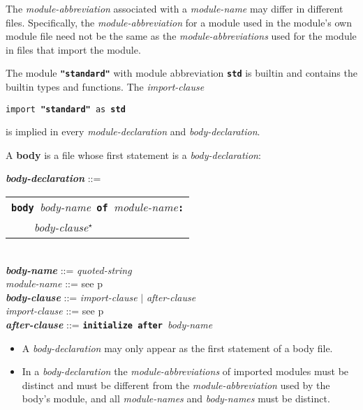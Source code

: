 \documentclass[12pt]{article}
\newcommand{\TT}[1]{{\tt \bfseries #1}}
\newcommand{\STAR}{{\Large $^\star$}}
\newcommand{\key}[1]{{\rm \bfseries #1}}
\newcommand{\ttkey}[1]{{\tt \bfseries #1}}
\newcommand{\emkey}[1]{{\em \bfseries #1}}
\newcommand{\pagref}[1]{p\pageref{#1}}
\newenvironment{indpar}[1][0.3in]%
	{\begin{list}{}%
		     {\setlength{\itemsep}{0in}%
		      \setlength{\topsep}{0in}%
		      \setlength{\parsep}{1ex}%
		      \setlength{\labelwidth}{#1}%
		      \setlength{\leftmargin}{#1}%
		      \addtolength{\leftmargin}{\labelsep}}%
	 \item}%
	{\end{list}}
\begin{document}
The {\em module-abbreviation} associated with a {\em module-name}
may differ in different files.  Specifically, the {\em module-abbreviation}
for a module used in the module's own module file need not be the same
as the {\em module-abbreviations} used for the module in files
that import the module.

The module \TT{"standard"}\index{standard@\TT{"standard"}} with
module abbreviation \ttkey{std} is builtin and contains the builtin types and
functions.  The {\em import-clause}
\begin{center}
{\tt import }\TT{"standard"}{\tt{} as \ttkey{std}}
\end{center}
is implied in every {\em module-declaration} and
{\em body-declaration}.

A \key{body} is a file whose first statement is a {\em body-declaration}:

\begin{indpar}
\emkey{body-declaration}\label{BODY-DECLARATION} ::=
    \begin{tabular}[t]{l}
    \TT{body }{\em body-name}\TT{ of }{\em module-name}\TT{:} \\
    \TT{~~~~}{\em body-clause}\STAR{} \\
    \end{tabular}
\\[0.5ex]
\emkey{body-name} ::= {\em quoted-string}
\\[0.5ex]
{\em module-name} ::= see \pagref{MODULE-NAME}
\\[0.5ex]
\emkey{body-clause} ::= {\em import-clause} $|$ {\em after-clause}
\\[0.5ex]
{\em import-clause} ::= see \pagref{IMPORT-CLAUSE}
\\[0.5ex]
\emkey{after-clause} ::= \ttkey{initialize after }{\em body-name}

\begin{itemize}

\item
A {\em body-declaration} may only appear as the first statement
of a body file.

\item
In a {\em body-declaration} the {\em module-abbreviations} of imported
modules must be distinct and must be different from the
{\em module-abbreviation} used by the body's module,
and all {\em module-names} and {\em body-names} must be distinct.
\end{itemize}

\end{indpar}
\end{document}
